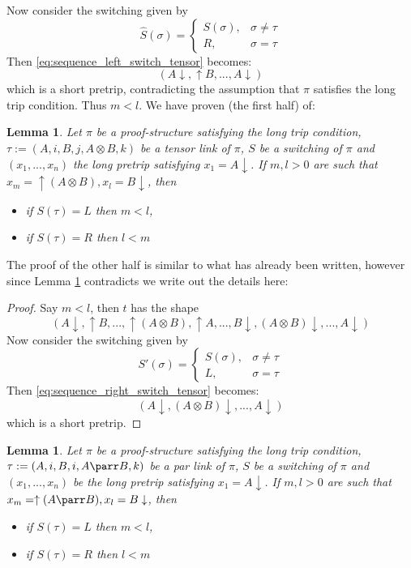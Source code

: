 \documentclass[12pt]{article}
\theoremstyle{plain}
\newtheorem{lemma}[thm]{Lemma}
\theoremstyle{definition}
\begin{document}
Now consider the switching given by
\[\hat{S}(\sigma) = \begin{cases}
S(\sigma),& \sigma \neq \tau\\
R, & \sigma = \tau
\end{cases}
\]
Then \eqref{eq:sequence_left_switch_tensor} becomes:
\begin{equation}
    (A\downarrow, \uparrow B, ..., A\downarrow)
\end{equation}
which is a short pretrip, contradicting the assumption that $\pi$ satisfies the long trip condition. Thus $m < l$. We have proven (the first half) of:
\begin{lemma}\label{lem:stays_contained_tensor}
Let $\pi$ be a proof-structure satisfying the long trip condition, $\tau := (A,i,B,j, A \otimes B,k)$ be a tensor link of $\pi$, $S$ be a switching of $\pi$ and $(x_1,...,x_n)$ the long pretrip satisfying $x_1 = A \downarrow$. If $m,l > 0$ are such that $x_m = \uparrow (A \otimes B), x_l = B \downarrow$, then
\begin{itemize}
    \item if $S(\tau) = L$ then $m < l$,
    \item if $S(\tau) = R$ then $l < m$
\end{itemize}
\end{lemma}
The proof of the other half is similar to what has already been written, however since Lemma \ref{lem:stays_contained_tensor} contradicts \cite[Lemma 2.9.1]{linearlogic} we write out the details here:
\begin{proof}
Say $m < l$, then $t$ has the shape
\begin{equation}\label{eq:sequence_right_switch_tensor}
(A\downarrow, \uparrow B, ..., \uparrow (A \otimes B), \uparrow A, ..., B \downarrow, (A \otimes B)\downarrow, ..., A\downarrow)
\end{equation}
Now consider the switching given by
\[
S'(\sigma) = 
\begin{cases}
S(\sigma),& \sigma \neq \tau\\
L, & \sigma = \tau
\end{cases}
\]
Then \eqref{eq:sequence_right_switch_tensor} becomes:
\begin{equation}
    (A\downarrow, (A \otimes B)\downarrow,..., A\downarrow)
\end{equation}
which is a short pretrip.
\end{proof}
\begin{lemma}\label{lem:stays_contained_par}
Let $\pi$ be a proof-structure satisfying the long trip condition, $\tau := (A,i,B,i,A\parr B, k)$ be a par link of $\pi$, $S$ be a switching of $\pi$ and $(x_1,...,x_n)$ be the long pretrip satisfying $x_1 = A\downarrow$. If $m,l > 0$ are such that $x_m = \uparrow (A \parr B), x_l = B\downarrow$, then
\begin{itemize}
    \item if $S(\tau) = L$ then $m < l$,
    \item if $S(\tau) = R$ then $l < m$
\end{itemize}
\end{lemma}
\end{document}
